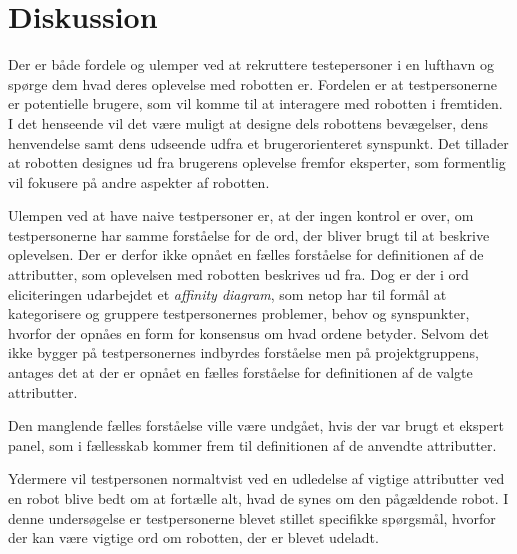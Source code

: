 \section*{Diskussion}
\label{Diskussion}
%
Der er både fordele og ulemper ved at rekruttere testepersoner i en lufthavn og spørge dem hvad deres oplevelse med robotten er. Fordelen er at testpersonerne er potentielle brugere, som vil komme til at interagere med robotten i fremtiden. I det henseende vil det være muligt at designe dels robottens bevægelser, dens henvendelse samt dens udseende udfra et brugerorienteret synspunkt. Det tillader at robotten designes ud fra brugerens oplevelse fremfor eksperter, som formentlig vil fokusere på andre aspekter af robotten. 

Ulempen ved at have naive testpersoner er, at der ingen kontrol er over, om testpersonerne har samme forståelse for de ord, der bliver brugt til at beskrive oplevelsen. Der er derfor ikke opnået en fælles forståelse for definitionen af de attributter, som oplevelsen med robotten beskrives ud fra. Dog er der i ord eliciteringen udarbejdet et \textit{affinity diagram}, som netop har til formål at kategorisere og gruppere testpersonernes problemer, behov og synspunkter, hvorfor der opnåes en form for konsensus om hvad ordene betyder. Selvom det ikke bygger på testpersonernes indbyrdes forståelse men på projektgruppens, antages det at der er opnået en fælles forståelse for definitionen af de valgte attributter.

Den manglende fælles forståelse ville være undgået, hvis der var brugt et ekspert panel, som i fællesskab kommer frem til definitionen af de anvendte attributter. \blankline   
%
 
 
 
 
 

Ydermere vil testpersonen normaltvist ved en udledelse af vigtige attributter ved en robot blive bedt om at fortælle alt, hvad de synes om den pågældende robot. I denne undersøgelse er testpersonerne blevet stillet specifikke spørgsmål, hvorfor der kan være vigtige ord om robotten, der er blevet udeladt.  
